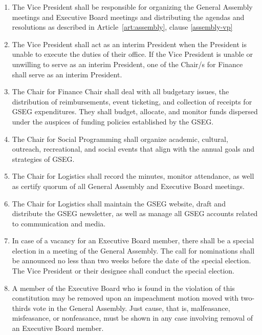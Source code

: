 \begin{enumerate}[label=\Alph*.]
\item The Vice President shall be responsible for organizing the General Assembly meetings and Executive Board meetings and distributing the agendas and resolutions as described in Article~\ref{art:assembly}, clause \ref{assembly-vp}

\item The Vice President shall act as an interim President when the President is unable to execute the duties of their office. If the Vice President is unable or unwilling to serve as an interim President, one of the Chair/s for Finance shall serve as an interim President.

\item The Chair for Finance Chair shall deal with all budgetary issues, the distribution of reimbursements, event ticketing, and collection of receipts for GSEG expenditures. They shall budget, allocate, and monitor funds dispersed under the auspices of funding policies established by the GSEG.

\item The Chair for Social Programming shall organize academic, cultural, outreach, recreational, and social events that align with the annual goals and strategies of GSEG. 

\item The Chair for Logistics shall record the minutes, monitor attendance, as well as certify quorum of all General Assembly and Executive Board meetings.

\item The Chair for Logistics shall maintain the GSEG website, draft and distribute the GSEG newsletter, as well as manage all GSEG accounts related to communication and media. 

\item In case of a vacancy for an Executive Board member, there shall be a special election in a meeting of the General Assembly. The call for nominations shall be announced no less than two weeks before the date of the special election. The Vice President or their designee shall conduct the special election.

\item A member of the Executive Board who is found in the violation of this constitution may be removed upon an impeachment motion moved with two-thirds vote in the General Assembly. Just cause, that is, malfeasance, misfeasance, or nonfeasance, must be shown in any case involving removal of an Executive Board member.

\end{enumerate}


